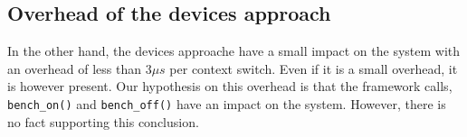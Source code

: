 \subsection{Overhead of the devices approach}

In the other hand, the devices approache have a small impact on the system with an overhead of less than $3\mu s$ per context switch.
Even if it is a small overhead, it is however present.
Our hypothesis on this overhead is that the framework calls, \texttt{bench\_on()} and \texttt{bench\_off()} have an impact on the system.
However, there is no fact supporting this conclusion.